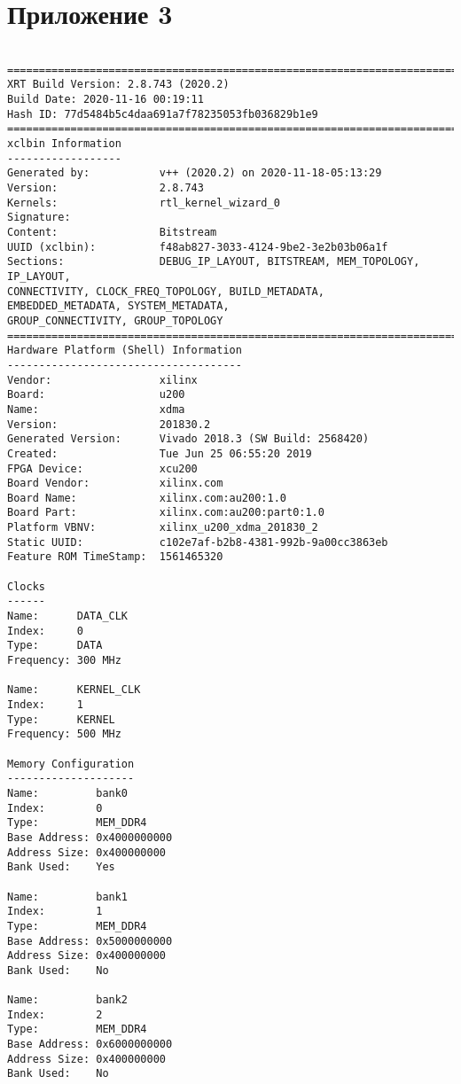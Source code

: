 \chapter*{Приложение 3}

\begin{lstlisting}[label=lst:lev_rec,caption=Содержимое xclbin.info-файла]

==============================================================================
XRT Build Version: 2.8.743 (2020.2)
Build Date: 2020-11-16 00:19:11
Hash ID: 77d5484b5c4daa691a7f78235053fb036829b1e9
==============================================================================
xclbin Information
------------------
Generated by:           v++ (2020.2) on 2020-11-18-05:13:29
Version:                2.8.743
Kernels:                rtl_kernel_wizard_0
Signature:              
Content:                Bitstream
UUID (xclbin):          f48ab827-3033-4124-9be2-3e2b03b06a1f
Sections:               DEBUG_IP_LAYOUT, BITSTREAM, MEM_TOPOLOGY, IP_LAYOUT, 
CONNECTIVITY, CLOCK_FREQ_TOPOLOGY, BUILD_METADATA, 
EMBEDDED_METADATA, SYSTEM_METADATA, 
GROUP_CONNECTIVITY, GROUP_TOPOLOGY
==============================================================================
Hardware Platform (Shell) Information
-------------------------------------
Vendor:                 xilinx
Board:                  u200
Name:                   xdma
Version:                201830.2
Generated Version:      Vivado 2018.3 (SW Build: 2568420)
Created:                Tue Jun 25 06:55:20 2019
FPGA Device:            xcu200
Board Vendor:           xilinx.com
Board Name:             xilinx.com:au200:1.0
Board Part:             xilinx.com:au200:part0:1.0
Platform VBNV:          xilinx_u200_xdma_201830_2
Static UUID:            c102e7af-b2b8-4381-992b-9a00cc3863eb
Feature ROM TimeStamp:  1561465320

Clocks
------
Name:      DATA_CLK
Index:     0
Type:      DATA
Frequency: 300 MHz

Name:      KERNEL_CLK
Index:     1
Type:      KERNEL
Frequency: 500 MHz

Memory Configuration
--------------------
Name:         bank0
Index:        0
Type:         MEM_DDR4
Base Address: 0x4000000000
Address Size: 0x400000000
Bank Used:    Yes

Name:         bank1
Index:        1
Type:         MEM_DDR4
Base Address: 0x5000000000
Address Size: 0x400000000
Bank Used:    No

Name:         bank2
Index:        2
Type:         MEM_DDR4
Base Address: 0x6000000000
Address Size: 0x400000000
Bank Used:    No


\end{lstlisting}
